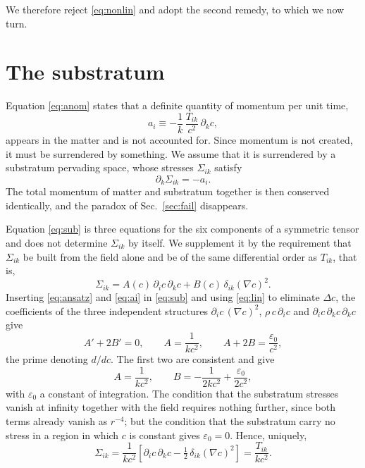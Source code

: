 \documentclass[aps,prd,reprint,amsmath,amssymb,nofootinbib,longbibliography]{revtex4-2}
\begin{document}
We therefore reject \eqref{eq:nonlin} and adopt the second remedy, to which we now turn.

\section{The substratum}

Equation \eqref{eq:anom} states that a definite quantity of momentum per unit time,
\begin{equation}
a_i \equiv - \frac{1}{k}\, \frac{T_{ik}}{c^{2}}\, \partial_k c ,
\label{eq:ai}
\end{equation}
appears in the matter and is not accounted for. Since momentum is not created, it must be
surrendered by something. We assume that it is surrendered by a substratum pervading space, whose
stresses $\Sigma_{ik}$ satisfy
\begin{equation}
\partial_k \Sigma_{ik} = - a_i .
\label{eq:sub}
\end{equation}
The total momentum of matter and substratum together is then conserved identically, and the
paradox of Sec.~\ref{sec:fail} disappears.

Equation \eqref{eq:sub} is three equations for the six components of a symmetric tensor and does not
determine $\Sigma_{ik}$ by itself. We supplement it by the requirement that $\Sigma_{ik}$ be built
from the field alone and be of the same differential order as $T_{ik}$, that is,
\begin{equation}
\Sigma_{ik} = A(c)\, \partial_i c\, \partial_k c + B(c)\, \delta_{ik} (\nabla c)^{2} .
\label{eq:ansatz}
\end{equation}
Inserting \eqref{eq:ansatz} and \eqref{eq:ai} in \eqref{eq:sub} and using \eqref{eq:lin} to
eliminate $\Delta c$, the coefficients of the three independent structures
$\partial_i c\,(\nabla c)^{2}$, $\rho\, c\, \partial_i c$ and
$\partial_i c\, \partial_k c\, \partial_k c$ give
\begin{equation}
A' + 2B' = 0 , \qquad A = \frac{1}{k c^{2}} , \qquad A + 2B = \frac{\varepsilon_0}{c^{2}} ,
\label{eq:AB}
\end{equation}
the prime denoting $d/dc$. The first two are consistent and give
\begin{equation}
A = \frac{1}{k c^{2}} , \qquad B = -\frac{1}{2 k c^{2}} + \frac{\varepsilon_0}{2 c^{2}} ,
\end{equation}
with $\varepsilon_0$ a constant of integration. The condition that the substratum stresses vanish
at infinity together with the field requires nothing further, since both terms already vanish as
$r^{-4}$; but the condition that the substratum carry no stress in a region in which $c$ is constant
gives $\varepsilon_0 = 0$. Hence, uniquely,
\begin{equation}
\Sigma_{ik} = \frac{1}{k c^{2}}\left[ \partial_i c\, \partial_k c
   - \tfrac{1}{2}\, \delta_{ik} (\nabla c)^{2} \right] = \frac{T_{ik}}{k c^{2}} .
\label{eq:Sigma}
\end{equation}
\end{document}
